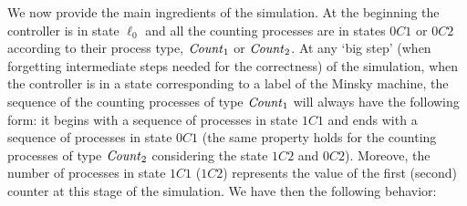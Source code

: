 We now provide the main ingredients of the simulation.
At the beginning the controller is in state $\ell_0$
and all the counting processes are in states $0C1$ or $0C2$ according to their process type,
$\mathit{Count}_1$ or $\mathit{Count}_2$.
At any `big step' (\ie when forgetting intermediate steps needed for the correctness) of the simulation,
when the controller is in a state corresponding to a label of the Minsky machine,
the sequence of the counting processes of type $\mathit{Count}_1$ will always have the following form:
it begins with a sequence of processes in state $1C1$ and ends with a sequence of processes in state $0C1$
(the same property holds for the counting processes of type $\mathit{Count}_2$ considering the state $1C2$ and $0C2$).
Moreove, the number of processes in state $1C1$ (\resp $1C2$) represents the value of the first (\resp second)
counter at this stage of the simulation. We have then the following behavior:
